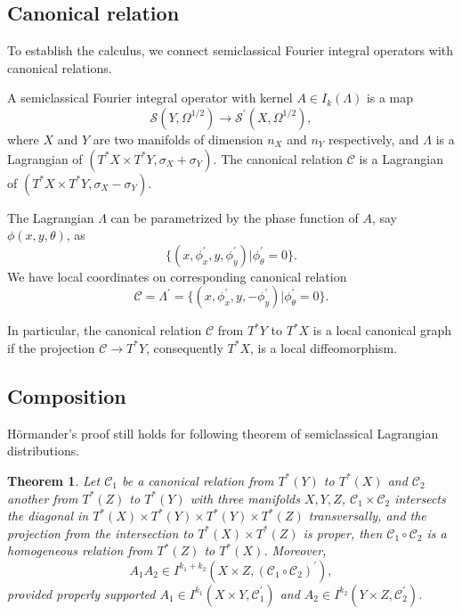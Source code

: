 \documentclass[10pt, a4paper, twoside]{amsart}
\numberwithin{equation}{section}
\newtheorem{theorem}{Theorem}
\theoremstyle{remark}
\begin{document}
\begin{appendix}
	\subsection{Canonical relation}
	
	To establish the calculus,  we connect semiclassical Fourier integral operators with canonical relations.
	
	A semiclassical Fourier integral operator with kernel $A \in I_k(\Lambda)$ is a map $$\mathcal{S}(Y, \Omega^{1/2}) \longrightarrow \mathcal{S}^\prime(X, \Omega^{1/2}),$$ where $X$ and $Y$ are two manifolds of dimension $n_X$ and $n_Y$ respectively, and $\Lambda$ is a Lagrangian of $(T^\ast X \times T^\ast Y , \sigma_X + \sigma_Y)$. The canonical relation $\mathcal{C}$ is a Lagrangian of $(T^\ast X \times T^\ast Y , \sigma_X - \sigma_Y)$.
	
	The Lagrangian $\Lambda$ can be parametrized by the phase function of $A$, say $\phi(x, y, \theta)$, as $$\{(x, \phi^\prime_x, y, \phi^\prime_y) | \phi^\prime_\theta = 0\}.$$ We have local coordinates on corresponding canonical relation $$\mathcal{C} = \Lambda^\prime = \{(x, \phi^\prime_x, y, -\phi^\prime_y) | \phi^\prime_\theta = 0\}.$$
	
	In particular, the canonical relation $\mathcal{C}$ from $T^\ast Y$ to $T^\ast X$ is a local canonical graph if the projection $\mathcal{C} \rightarrow T^\ast Y$, consequently $T^\ast X$, is a local diffeomorphism.
	
	
	
	\subsection{Composition}
	
	H\"{o}rmander's proof still holds for following theorem of semiclassical Lagrangian distributions.
	
	\begin{theorem}\label{composition-semiFIO}Let $\mathcal{C}_1$ be a canonical relation from $T^\ast (Y)$ to $T^\ast (X)$ and $\mathcal{C}_2$ another from $T^\ast (Z)$ to $T^\ast (Y)$ with three manifolds $X, Y, Z$, $\mathcal{C}_1 \times \mathcal{C}_2$ intersects the diagonal in $T^\ast (X) \times T^\ast (Y) \times T^\ast (Y) \times T^\ast (Z)$ transversally, and the projection from the intersection to $T^\ast (X) \times T^\ast (Z)$ is proper, then $\mathcal{C}_1 \circ \mathcal{C}_2$ is a homogeneous relation from $T^\ast (Z)$ to $T^\ast (X)$. Moreover, $$A_1A_2 \in I^{k_1 + k_2} (X \times Z, (\mathcal{C}_1 \circ \mathcal{C}_2)^\prime),$$ provided properly supported $A_1 \in I^{k_1}(X \times Y, \mathcal{C}_1^\prime)$ and $A_2 \in I^{k_2} (Y \times Z, \mathcal{C}_2^\prime)$.\end{theorem}
	

\end{appendix}
\end{document}
